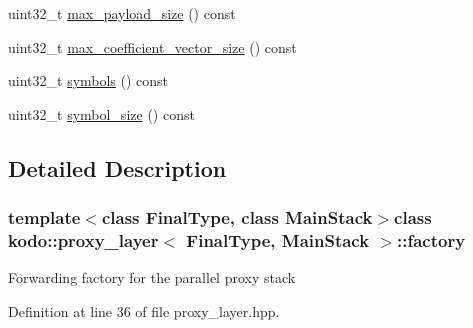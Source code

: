 \begin{DoxyCompactItemize}
uint32\-\_\-t \hyperlink{classkodo_1_1proxy__layer_1_1factory_abbedd4d517ffe5cb31a6840dd7e4cd77}{max\-\_\-payload\-\_\-size} () const 
\begin{DoxyCompactList}\small\item\em \end{DoxyCompactList}\item 
uint32\-\_\-t \hyperlink{classkodo_1_1proxy__layer_1_1factory_a45e3819349fa521ed9474ff0cfba3f2a}{max\-\_\-coefficient\-\_\-vector\-\_\-size} () const 
\begin{DoxyCompactList}\small\item\em \end{DoxyCompactList}\item 
uint32\-\_\-t \hyperlink{classkodo_1_1proxy__layer_1_1factory_a36e3db4b204afeddc288648364c8f293}{symbols} () const 
\begin{DoxyCompactList}\small\item\em \end{DoxyCompactList}\item 
uint32\-\_\-t \hyperlink{classkodo_1_1proxy__layer_1_1factory_aaf485614a54f95f3f5e8d1088bc0b284}{symbol\-\_\-size} () const 
\begin{DoxyCompactList}\small\item\em \end{DoxyCompactList}\end{DoxyCompactItemize}


\subsection{Detailed Description}
\subsubsection*{template$<$class Final\-Type, class Main\-Stack$>$class kodo\-::proxy\-\_\-layer$<$ Final\-Type, Main\-Stack $>$\-::factory}

Forwarding factory for the parallel proxy stack 

Definition at line 36 of file proxy\-\_\-layer.\-hpp.



